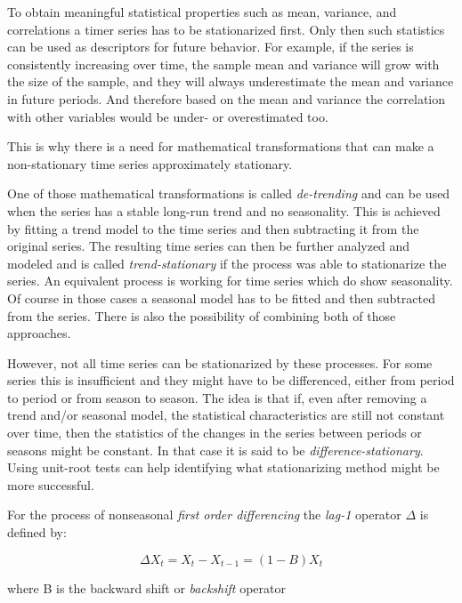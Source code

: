To obtain meaningful statistical properties such as mean, variance, and correlations a timer series has to be stationarized first. Only then such statistics can be used as descriptors for future behavior.
For example, if the series is consistently increasing over time, the sample mean and variance will grow with the size of the sample, and they will always underestimate the mean and variance in future periods. And therefore based on the mean and variance the correlation with other variables would be under- or overestimated too.

This is why there is a need for mathematical transformations that can make a non-stationary time series approximately stationary.

One of those mathematical transformations is called \textit{de-trending} and can be used when the series has a stable long-run trend and no seasonality. This is achieved by fitting a trend model to the time series and then subtracting it from the original series. The resulting time series can then be further analyzed and modeled and is called \textit{trend-stationary} if the process was able to stationarize the series. An equivalent process is working for time series which do show seasonality. Of course in those cases a seasonal model has to be fitted and then subtracted from the series. There is also the possibility of combining both of those approaches.

However, not all time series can be stationarized by these processes. For some series this is insufficient and they might have to be differenced, either from period to period or from season to season. The idea is that if, even after removing a trend and/or seasonal model, the statistical characteristics are still not constant over time, then the statistics of the changes in the series between periods or seasons might be constant. In that case it is said to be \textit{difference-stationary}. Using unit-root tests can help identifying what stationarizing method might be more successful.

For the process of nonseasonal \textit{first order differencing} the \textit{lag-1} operator \(\Delta\) is defined by:

\begin{equation}\label{eq:first_difference}
\Delta X_t = X_t - X_{t-1} = (1-B)X_t
\end{equation}

where B is the backward shift or \textit{backshift} operator

